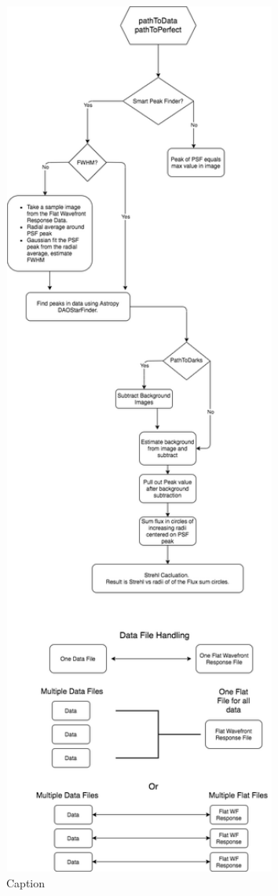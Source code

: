 \documentclass[12pt]{spieman}  %
\begin{document}
\begin{spacing}{2}
\begin{figure}
    \centering
    \includegraphics[width=0.8\textwidth]{strehlclass2.png}
    \caption{Caption}
    \label{fig:strehlClass}
\end{figure}


\end{spacing}
\end{document}
